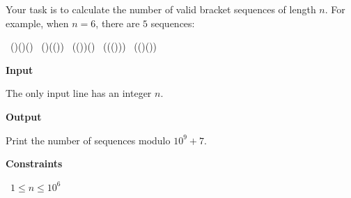 Your task is to calculate the number of valid bracket sequences of length $n$. For example, when $n=6$, there are $5$ sequences:

\textbullet\ ()()()
\textbullet\ ()(())
\textbullet\ (())()
\textbullet\ ((()))
\textbullet\ (()())

\vspace{0.3cm}\noindent\textbf{Input}

The only input line has an integer $n$.

\vspace{0.3cm}\noindent\textbf{Output}

Print the number of sequences modulo $10^9+7$.

\vspace{0.3cm}\noindent\textbf{Constraints}

\textbullet\ $1 \le n \le 10^6$